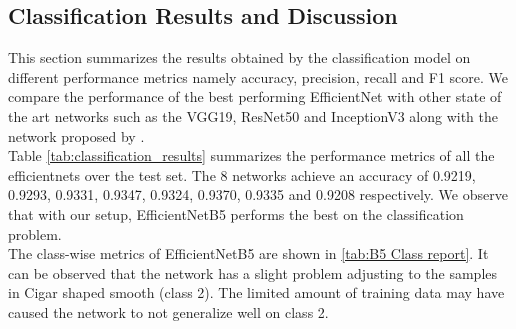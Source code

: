\documentclass[fleqn,usenatbib]{mnras}
\begin{document}
\subsection{Classification Results and Discussion}
\hspace*{0.25 in}This section summarizes the results obtained by the classification model on different performance metrics namely accuracy, precision, recall and F1 score. We compare the performance of the best performing EfficientNet with other state of the art networks such as the VGG19, ResNet50 and InceptionV3 along with the network proposed by \citet{dai2018galaxy}.\\

\hspace*{0.25 in}Table \ref{tab:classification_results} summarizes the performance metrics of all the efficientnets over the test set. The 8 networks achieve an accuracy of 0.9219, 0.9293, 0.9331, 0.9347, 0.9324, 0.9370, 0.9335 and 0.9208 respectively. We observe that with our setup, EfficientNetB5 performs the best on the classification problem.\\
\hspace*{0.25 in}The class-wise metrics of EfficientNetB5 are shown in \ref{tab:B5 Class report}. It can be observed that the network has a slight problem adjusting to the samples in Cigar shaped smooth (class 2). The limited amount of training data may have caused the network to not generalize well on class 2. 

\begin{center}
    
\end{center}
\end{document}
